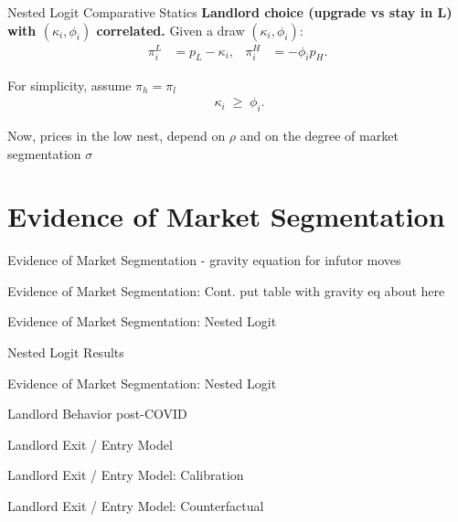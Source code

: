 \documentclass[10pt, xcolor=dvipsnames]{beamer}
\begin{document}
\begin{frame}{Nested Logit Comparative Statics}
    \textbf{Landlord choice (upgrade vs stay in L) with $(\kappa_i,\phi_i)$ correlated.}
Given a draw $(\kappa_i,\phi_i)$:
\begin{align*}
\pi_i^{L} &= p_L - \kappa_i, 
&
\pi_i^{H} &= -\phi_i p_H.
\end{align*}

For simplicity, assume $\pi_h = \pi_l$
\begin{align*}
\boxed{\;\kappa_i  \;\ge\; \phi_i }.
\end{align*}

Now, prices in the low nest, depend on $\rho$ and on the degree of market segmentation $\sigma$

    
\end{frame}

\section{Evidence of Market Segmentation}

\begin{frame}{Evidence of Market Segmentation}
    - gravity equation for infutor moves
\end{frame}

\begin{frame}{Evidence of Market Segmentation: Cont.}
    put table with gravity eq about here
\end{frame}

\begin{frame}{Evidence of Market Segmentation: Nested Logit}
    
\end{frame}

\begin{frame}{Nested Logit Results}
    
\end{frame}

\begin{frame}{Evidence of Market Segmentation: Nested Logit}
\end{frame}

\begin{frame}{Landlord Behavior post-COVID}
    
\end{frame}

\begin{frame}{Landlord Exit / Entry Model}
    
\end{frame}

\begin{frame}{Landlord Exit / Entry Model: Calibration}
    
\end{frame}

\begin{frame}{Landlord Exit / Entry Model: Counterfactual}
    
\end{frame}
    
\end{document}
